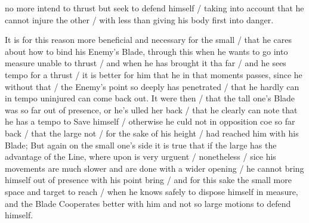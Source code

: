 \newpage


\newpage


no more intend to thrust but seek to defend himself / taking into
account that he cannot injure the other / with less than giving
his body first into danger.

It is for this reason more beneficial and necessary for the small /
that he cares about how to bind his Enemy's Blade, through this when he
wants to go into measure unable to thrust / and when he has brought it
tha far / and he sees tempo for a thrust / it is better for him that
he in that moments passes, since he without that / 
the Enemy's point so deeply has penetrated / that he hardly can in
tempo uninjured can come back out. It were then / that the tall one's
Blade was so far out of presence, or he's ulled her back / that he
clearly can note that he has a tempo to Save himself /
otherwise he culd not in opposition coe so far back / that the large
not / for the sake of his height / had reached him with his Blade; But
again on the small one's side it is true that if the large has the
advantage of the Line, where upon is very urguent / nonetheless /
sice his movements are much slower and are done with a wider opening /
he cannot bring himself out of presence with his point bring / and for
this sake the small more space and target to reach / when he knows
safely to dispose himself in measure, and the Blade Cooperates better
with him and not so large motions to defend himself.

